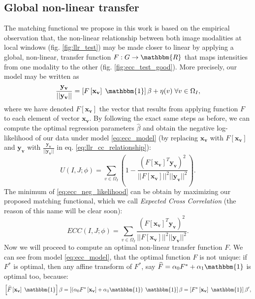 \subsection{Global non-linear transfer}
The matching functional we propose in this work is based on the empirical observation that, the non-linear relationship between both image modalities at local windows (fig. \ref{fig:llr_test}) may be made closer to linear by applying a global, non-linear, transfer function $F: G \rightarrow \mathbbm{R}$ that maps intensities from one modality to the other (fig. \ref{fig:ecc_test_good}). More precisely, our model may be written as
\begin{equation}\label{eq:ecc_model}
    \frac{\mathbf{y_{v}}}{||\mathbf{y_{v}}||} = \left[F\left[\mathbf{x_{v}}\right] \; \mathbbm{1}\right]\beta + \eta(v) \; \forall v\in\Omega_{I},
\end{equation}
where we have denoted $F[\mathbf{x_{v}}]$ the vector that results from applying function $F$ to each element of vector $\mathbf{x_{v}}$. By following the exact same steps as before, we can compute the optimal regression parameters $\widehat{\beta}$ and obtain the negative log-likelihood of our data under model \eqref{eq:ecc_model} (by replacing $\mathbf{x_{v}}$ with $F[\mathbf{x_{v}}]$ and $\mathbf{y_{v}}$ with $\frac{\mathbf{y_{v}}}{||\mathbf{y_{v}}||}$ in eq. \eqref{eq:llr_cc_relationship}):
\begin{equation}\label{eq:ecc_neg_likelihood}
    U(I, J;\phi) = \sum_{v\in\Omega_{I}}\left(1-\frac{\left(F\left[\mathbf{x_{v}}\right]^{T} \mathbf{y_{v}}\right)^{2}}{||F\left[\mathbf{x_{v}}\right]||^{2}||\mathbf{y_{v}}||^{2}}\right).
\end{equation}
The minimum of \eqref{eq:ecc_neg_likelihood} can be obtain by maximizing our proposed matching functional, which we call \emph{Expected Cross Correlation} (the reason of this name will be clear soon):
\begin{equation}\label{eq:ecc_functional}
    ECC(I, J;\phi) = \sum_{v\in\Omega_{I}}\frac{\left(F\left[\mathbf{x_{v}}\right]^{T} \mathbf{y_{v}}\right)^{2}}{||F\left[\mathbf{x_{v}}\right]||^{2}||\mathbf{y_{v}}||^{2}}.
\end{equation}
Now we will proceed to compute an optimal non-linear transfer function $F$. We can see from model \eqref{eq:ecc_model}, that the optimal function $F$ is not unique: if $F^{*}$ is optimal, then any affine transform of $F^{*}$, say $\widehat{F} = \alpha_{0} F^{*} + \alpha_{1}\mathbbm{1}$ is optimal too, because:
\begin{displaymath}
    \left[\widehat{F}\left[\mathbf{x_{v}}\right] \; \mathbbm{1}\right]\beta =
    \left[\left(\alpha_{0}F^{*}\left[\mathbf{x_{v}}\right]+\alpha_{1}\mathbbm{1}\right) \; \mathbbm{1}\right]\beta =
    \left[F^{*}\left[\mathbf{x_{v}}\right] \; \mathbbm{1}\right]\beta',
\end{displaymath}
